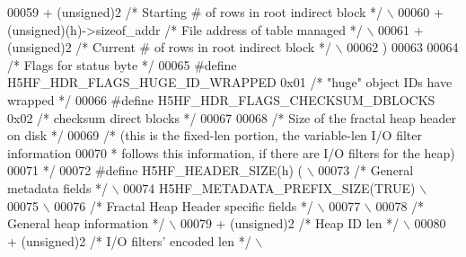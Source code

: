 \begin{DoxyCode}
00059 \textcolor{preprocessor}{    + (unsigned)2 }\textcolor{comment}{/* Starting # of rows in root indirect block */}\textcolor{preprocessor}{             \(\backslash\)}
00060 \textcolor{preprocessor}{    + (unsigned)(h)->sizeof\_addr }\textcolor{comment}{/* File address of table managed */}\textcolor{preprocessor}{          \(\backslash\)}
00061 \textcolor{preprocessor}{    + (unsigned)2 }\textcolor{comment}{/* Current # of rows in root indirect block */}\textcolor{preprocessor}{              \(\backslash\)}
00062 \textcolor{preprocessor}{    )}
00063 
00064 \textcolor{comment}{/* Flags for status byte */}
00065 \textcolor{preprocessor}{#define H5HF\_HDR\_FLAGS\_HUGE\_ID\_WRAPPED 0x01     }\textcolor{comment}{/* "huge" object IDs have wrapped */}\textcolor{preprocessor}{}
00066 \textcolor{preprocessor}{#define H5HF\_HDR\_FLAGS\_CHECKSUM\_DBLOCKS 0x02    }\textcolor{comment}{/* checksum direct blocks */}\textcolor{preprocessor}{}
00067 
00068 \textcolor{comment}{/* Size of the fractal heap header on disk */}
00069 \textcolor{comment}{/* (this is the fixed-len portion, the variable-len I/O filter information}
00070 \textcolor{comment}{ *      follows this information, if there are I/O filters for the heap)}
00071 \textcolor{comment}{ */}
00072 \textcolor{preprocessor}{#define H5HF\_HEADER\_SIZE(h)     (                                             \(\backslash\)}
00073 \textcolor{preprocessor}{    }\textcolor{comment}{/* General metadata fields */}\textcolor{preprocessor}{                                             \(\backslash\)}
00074 \textcolor{preprocessor}{    H5HF\_METADATA\_PREFIX\_SIZE(TRUE)                                           \(\backslash\)}
00075 \textcolor{preprocessor}{                                                                              \(\backslash\)}
00076 \textcolor{preprocessor}{    }\textcolor{comment}{/* Fractal Heap Header specific fields */}\textcolor{preprocessor}{                                 \(\backslash\)}
00077 \textcolor{preprocessor}{                                                                              \(\backslash\)}
00078 \textcolor{preprocessor}{    }\textcolor{comment}{/* General heap information */}\textcolor{preprocessor}{                                            \(\backslash\)}
00079 \textcolor{preprocessor}{    + (unsigned)2 }\textcolor{comment}{/* Heap ID len */}\textcolor{preprocessor}{                                           \(\backslash\)}
00080 \textcolor{preprocessor}{    + (unsigned)2 }\textcolor{comment}{/* I/O filters' encoded len */}\textcolor{preprocessor}{                              \(\backslash\)}

\end{DoxyCode}
